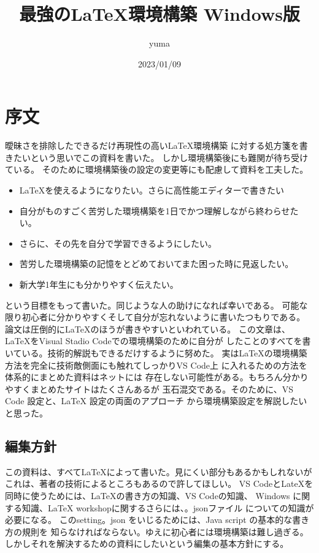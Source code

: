 \documentclass{ltjsarticle}
\begin{document}
\title{最強の\LaTeX 環境構築 Windows版}
\author{yuma}
\date{2023/01/09}
\maketitle
\section{序文}
曖昧さを排除したできるだけ再現性の高い\LaTeX 環境構築
に対する処方箋を書きたいという思いでこの資料を書いた。
しかし環境構築後にも難関が待ち受けている。
そのために環境構築後の設定の変更等にも配慮して資料を工夫した。
\begin{itemize}
  \item \LaTeX を使えるようになりたい。さらに高性能エディターで書きたい
  \item 自分がものすごく苦労した環境構築を1日でかつ理解しながら終わらせたい。
  \item さらに、その先を自分で学習できるようにしたい。
  \item 苦労した環境構築の記憶をとどめておいてまた困った時に見返したい。
  \item 新大学1年生にも分かりやすく伝えたい。
\end{itemize}
という目標をもって書いた。同じような人の助けになれば幸いである。
可能な限り初心者に分かりやすくそして自分が忘れないように書いたつもりである。
論文は圧倒的に\LaTeX のほうが書きやすいといわれている。
この文章は、\LaTeX をVisual Stadio Codeでの環境構築のために自分が
したことのすべてを書いている。技術的解説もできるだけするように努めた。
実は\LaTeX の環境構築方法を完全に技術敵側面にも触れてしっかりVS Code上
に入れるための方法を体系的にまとめた資料はネットには
存在しない可能性がある。もちろん分かりやすくまとめたサイトはたくさんあるが
玉石混交である。そのために、VS Code 設定と、LaTeX 設定の両面のアプローチ
から環境構築設定を解説したいと思った。


\subsection{編集方針}

この資料は、すべて\LaTeX によって書いた。見にくい部分もあるかもしれないが
これは、著者の技術によるところもあるので許してほしい。
VS CodeとLateXを同時に使うためには、LaTeXの書き方の知識、VS Codeの知識、
Windows に関する知識、LaTeX workshopに関するさらには、。jsonファイル
についての知識が必要になる。
このsetting。json をいじるためには、Java script の基本的な書き方の規則を
知らなければならない。ゆえに初心者には環境構築は難し過ぎる。
しかしそれを解決するための資料にしたいという編集の基本方針にする。
\end{document}
